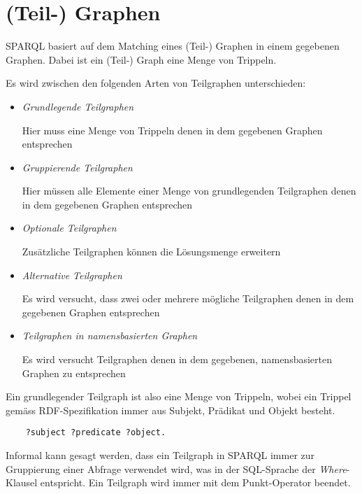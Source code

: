 \section{(Teil-) Graphen}
\label{sec:sparql_graph}

SPARQL basiert auf dem Matching eines (Teil-) Graphen in einem gegebenen Graphen. Dabei ist ein (Teil-) Graph eine Menge von Trippeln.

Es wird zwischen den folgenden Arten von Teilgraphen unterschieden:
\begin{itemize}
\item \textit{Grundlegende Teilgraphen}

Hier muss eine Menge von Trippeln denen in dem gegebenen Graphen entsprechen

\item \textit{Gruppierende Teilgraphen}

Hier müssen alle Elemente einer Menge von grundlegenden Teilgraphen denen in dem gegebenen Graphen entsprechen

\item \textit{Optionale Teilgraphen}

Zusätzliche Teilgraphen können die Lösungsmenge erweitern

\item \textit{Alternative Teilgraphen}

Es wird versucht, dass zwei oder mehrere mögliche Teilgraphen denen in dem gegebenen Graphen entsprechen

\item \textit{Teilgraphen in namensbasierten Graphen}

Es wird versucht Teilgraphen denen in dem gegebenen, namensbasierten Graphen zu entsprechen
\end{itemize}

Ein grundlegender Teilgraph ist also eine Menge von Trippeln, wobei ein Trippel gemäss RDF-Spezifikation immer aus Subjekt, Prädikat und Objekt besteht.~\cite[3.1 Triples]{w3rdf}

\lstset{language=XML}
\begin{lstlisting}
    ?subject ?predicate ?object.
\end{lstlisting}

Informal kann gesagt werden, dass ein Teilgraph in SPARQL immer zur Gruppierung einer Abfrage verwendet wird, was in der SQL-Sprache der \textit{Where}-Klausel entspricht. Ein Teilgraph wird immer mit dem Punkt-Operator beendet.

